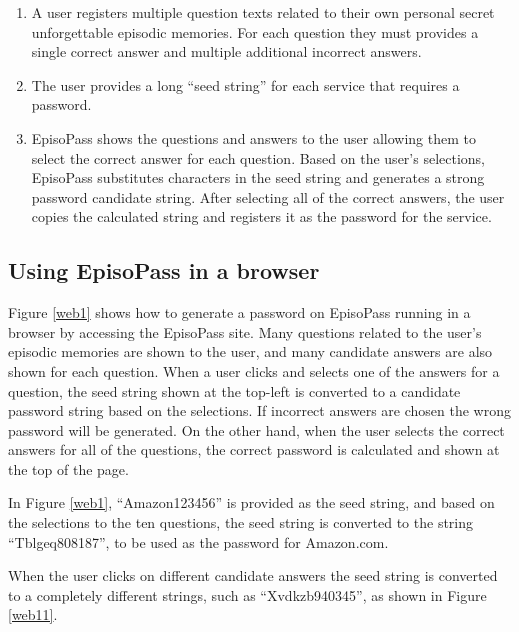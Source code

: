 \documentclass[runningheads,a4paper]{llncs}
\begin{document}
\begin{enumerate}
\item A user registers multiple question texts related to their own personal
secret unforgettable episodic memories. For each question they must provides
a single correct answer and multiple additional incorrect answers.

\item The user provides a long ``seed string'' for each service that requires
a password.

\item EpisoPass shows the questions and answers to the user allowing
them to select the correct answer for each question.
Based on the user's selections,
EpisoPass substitutes characters in the seed string and generates a
strong password candidate string.
After selecting all of the correct answers,
the user copies the calculated string
and registers it as the password for the service.
\end{enumerate}

\subsection{Using EpisoPass in a browser}

Figure \ref{web1} shows how to generate a password
on EpisoPass running in a browser by accessing the EpisoPass site.
Many questions related to the user's episodic memories are shown to the user,
and many candidate answers are also shown for each question.
When a user clicks and selects one of the answers for a question,
the seed string shown at the top-left is converted to a
candidate password string based on the selections. If incorrect answers are chosen the wrong password will be generated. On the other hand, when the user selects the correct answers for all of the questions,
the correct password is calculated and shown at the top of the page.


In Figure \ref{web1},
``\textsf{Amazon123456}'' is provided as the seed string,
and based on the selections to the ten questions,
the seed string is converted to the string
``\textsf{Tblgeq808187}'',
to be used as the password for Amazon.com.

When the user clicks on different candidate answers 
the seed string is converted to a completely different strings, such as
``\textsf{Xvdkzb940345}'', as shown in Figure \ref{web11}.
\end{document}
